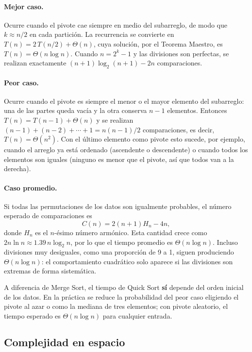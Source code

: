 \paragraph{Mejor caso.} Ocurre cuando el pivote cae siempre en medio del subarreglo, de modo que $k \approx n/2$ en cada partición. La recurrencia se convierte en $T(n) = 2\,T(n/2) + \Theta(n)$, cuya solución, por el Teorema Maestro, es $T(n) = \Theta(n \log n)$. Cuando $n = 2^k - 1$ y las divisiones son perfectas, se realizan exactamente $(n+1)\log_2(n+1) - 2n$ comparaciones.

\paragraph{Peor caso.} Ocurre cuando el pivote es siempre el menor o el mayor elemento del subarreglo: una de las partes queda vacía y la otra conserva $n - 1$ elementos. Entonces $T(n) = T(n-1) + \Theta(n)$ y se realizan $(n-1) + (n-2) + \cdots + 1 = n(n-1)/2$ comparaciones, es decir, $T(n) = \Theta(n^2)$. Con el último elemento como pivote esto sucede, por ejemplo, cuando el arreglo ya está ordenado (ascendente o descendente) o cuando todos los elementos son iguales (ninguno es menor que el pivote, así que todos van a la derecha).

\paragraph{Caso promedio.} Si todas las permutaciones de los datos son igualmente probables, el número esperado de comparaciones es
\[
  C(n) = 2(n+1)H_n - 4n,
\]
donde $H_n$ es el $n$-ésimo número armónico. Esta cantidad crece como $2n\ln n \approx 1.39\,n\log_2 n$, por lo que el tiempo promedio es $\Theta(n \log n)$. Incluso divisiones muy desiguales, como una proporción de 9 a 1, siguen produciendo $\Theta(n \log n)$: el comportamiento cuadrático solo aparece si las divisiones son extremas de forma sistemática.

A diferencia de Merge Sort, el tiempo de Quick Sort \textbf{sí} depende del orden inicial de los datos. En la práctica se reduce la probabilidad del peor caso eligiendo el pivote al azar o como la mediana de tres elementos; con pivote aleatorio, el tiempo esperado es $\Theta(n \log n)$ para cualquier entrada.

\subsection{Complejidad en espacio}


